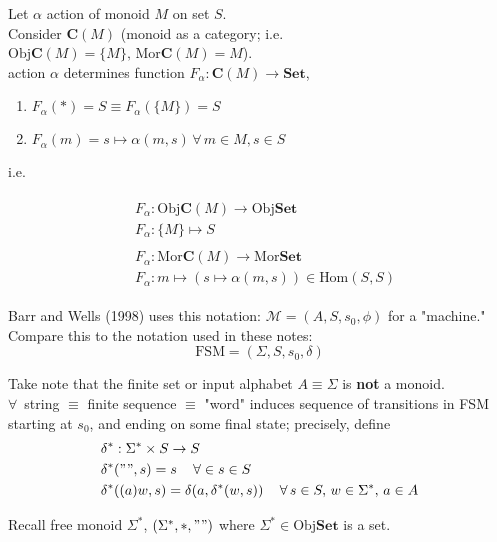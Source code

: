 \documentclass[10pt]{amsart}
\begin{document}
\begin{multicols*}{2}
Let $\alpha$ action of monoid $M$ on set $S$. \\

Consider $\mathbf{C}(M)$ (monoid as a category; i.e. $\text{Obj}\mathbf{C}(M) = \lbrace M \rbrace, \, \text{Mor}\mathbf{C}(M) = M$). \\
action $\alpha$ determines function $F_{\alpha} : \mathbf{C}(M) \to \mathbf{Set}$, 
\begin{enumerate}
	\item $F_{\alpha}(*) = S \equiv F_{\alpha}(\lbrace M \rbrace ) = S$
	\item  $F_{\alpha}(m) = s \mapsto \alpha(m, s) \, \forall \, m \in M, s \in S$
\end{enumerate}
i.e.

\[
\begin{gathered}
\begin{aligned}
& F_{\alpha} : \text{Obj}\mathbf{C}(M) \to \text{Obj}\mathbf{Set} \\ 
& F_{\alpha} : \lbrace M \rbrace \mapsto S 
\end{aligned} \\
\begin{aligned}
& F_{\alpha} : \text{Mor}\mathbf{C}(M) \to \text{Mor}\textbf{Set} \\ 
& F_{\alpha} : m \mapsto (s\mapsto \alpha(m,s)) \in \text{Hom}(S,S)
\end{aligned}
\end{gathered}
\]

Barr and Wells (1998) \cite{BW1998} uses this notation: $\mathcal{M} = (A, S, s_0, \phi)$ for a "machine." Compare this to the notation used in these notes:
\[
\text{FSM} = (\Sigma, S, s_0, \delta)
\]

Take note that the finite set or input alphabet $A \equiv \Sigma$ is \textbf{not} a monoid. \\

$\forall \, $ string $\equiv $ finite sequence $\equiv $ "word" induces sequence of transitions in FSM starting at $s_0$, and ending on some final state; precisely, define
\[
\begin{aligned}
& \delta^* : \Sigma^* \times S \to S \\ 
& \delta^*("", s) = s \quad \, \forall \in s \in S \\ 
& \delta^*((a)w, s) = \delta(a, \delta^*(w,s)) \quad \, \forall \, s \in S, \, w\in \Sigma^*, \, a\in A
\end{aligned}
\]

Recall free monoid $\Sigma^*$, $(\Sigma^*, *, "")$ where $\Sigma^* \in \text{Obj}\mathbf{Set}$ is a set. \\


\end{multicols*}
\end{document}
